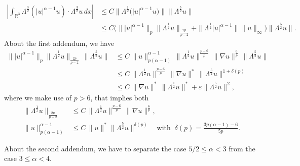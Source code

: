 \documentclass[a4paper]{article}
\newcommand{\dx}{\, dx}
\newcommand{\R}{\mathbb{R}}
\begin{document}
\begin{equation*}
  \begin{aligned}
    \left| \int_{\R^3}\Lambda^{\frac{3}{2}}(|u|^{\alpha-1}u)\cdot
      \Lambda^{\frac{3}{2}} u \dx \right| &\leq C \|
    \Lambda^{\frac{1}{2}}\big(|u|^{\alpha-1} u\big) \|
    \|\Lambda^{\frac{5}{2}}u\|
    \\
    &\leq C\big(\||u|^{\alpha-1}\|_p
    \|\Lambda^{\frac{1}{2}}u\|_{\frac{2p}{p-2}} +
    \|\Lambda^{\frac{1}{2}}|u|^{\alpha-1}\|\|u\|_\infty \big)
    \|\Lambda^{\frac{5}{2}}u\|.
  \end{aligned}
\end{equation*}
About the first addendum, we have
\begin{equation*}
  \begin{aligned}
    \||u|^{\alpha-1}\|_p
    \|\Lambda^{\frac{1}{2}}u\|_{\frac{2p}{p-2}}\,\|\Lambda^{\frac{5}{2}}u\|&\le
    C\,\|u\|^{\alpha-1}_{p(\alpha-1)}\,\|\Lambda^\frac12
    u\|^{\frac{p-6}{p}}\,\|\nabla u\|^{\frac{6}{p}}\,
    \|\Lambda^{\frac{5}{2}}u\|
    \\
    & \leq C \,\|\Lambda^\frac12 u\|^{\frac{p-6}{p}}\,\|\nabla
    u\|^{*}\, \|\Lambda^\frac52 u\|^{1+\delta(p)}
    \\
    & \leq C\,\|\nabla u\|^{*} \,\|\Lambda^\frac12
    u\|^{*}+\varepsilon\|\Lambda^{\frac{5}{2}}u\|^2,
  \end{aligned}
\end{equation*}
where we make use of $p>6$, that implies both
%
\begin{equation*}
  \begin{aligned}
    \|\Lambda^\frac12 u\|_{\frac{2p}{p-2}}&\le C\,\|\Lambda^\frac12
    u\|^{\frac{p-6}{p}}\,\|\nabla u\|^{\frac{6}{p}},
    \\
    \|u\|_{p(\alpha-1)}^{\alpha-1} &\le C\,\|u\|^{*} \|\Lambda^\frac52
    u\|^{\delta(p)} \,\,\,\, \mbox{ with } \
    \delta(p)=\frac{3p(\alpha-1)-6}{5p}.
  \end{aligned}
\end{equation*}

  About the second addendum, we have to separate
  the case $5/2\leq \alpha <3$ from the case $3 \le \alpha <4$.
      
\end{document}
